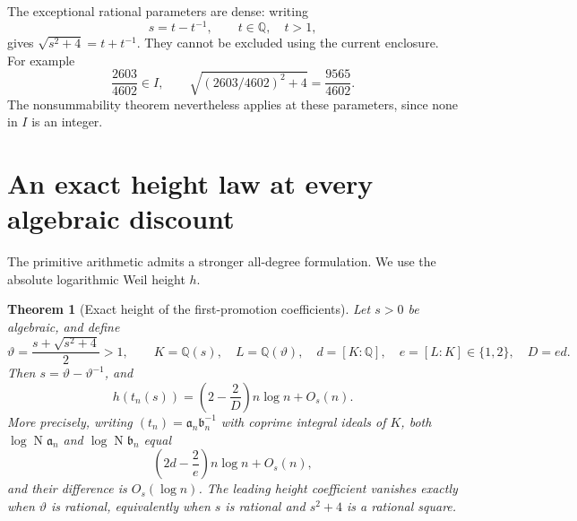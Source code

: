 \documentclass[11pt]{article}
\newtheorem{theorem}{Theorem}[section]
\theoremstyle{remark}
\newcommand{\Q}{\mathbb Q}
\DeclareMathOperator{\Norm}{N}
\begin{document}
The exceptional rational parameters are dense: writing
\[
 s=t-t^{-1},\qquad t\in\Q,\quad t>1,
\]
gives $\sqrt{s^2+4}=t+t^{-1}$. They cannot be excluded using the
current enclosure. For example
\[
 \frac{2603}{4602}\in I,\qquad
 \sqrt{(2603/4602)^2+4}=\frac{9565}{4602}.
\]
The nonsummability theorem nevertheless applies at these parameters,
since none in $I$ is an integer.

\section{An exact height law at every algebraic discount}

The primitive arithmetic admits a stronger all-degree formulation.
We use the absolute logarithmic Weil height $h$.

\begin{theorem}[Exact height of the first-promotion coefficients]
\label{thm:alg-den}
Let $s>0$ be algebraic, and define
\[
 \vartheta=\frac{s+\sqrt{s^2+4}}2>1,\qquad
 K=\Q(s),\quad L=\Q(\vartheta),\quad
 d=[K:\Q],\quad e=[L:K]\in\{1,2\},\quad D=ed.
\]
Then $s=\vartheta-\vartheta^{-1}$, and
\begin{equation}\label{eq:alg-den}
 \boxed{\displaystyle
 h(t_n(s))=\left(2-\frac2D\right)n\log n+O_s(n).}
\end{equation}
More precisely, writing $(t_n)=\mathfrak a_n\mathfrak b_n^{-1}$
with coprime integral ideals of $K$, both
$\log\Norm\mathfrak a_n$ and $\log\Norm\mathfrak b_n$ equal
\[
 \left(2d-\frac2e\right)n\log n+O_s(n),
\]
and their difference is $O_s(\log n)$.
The leading height coefficient vanishes exactly when $\vartheta$
is rational, equivalently when $s$ is rational and $s^2+4$ is a
rational square.
\end{theorem}
\end{document}
